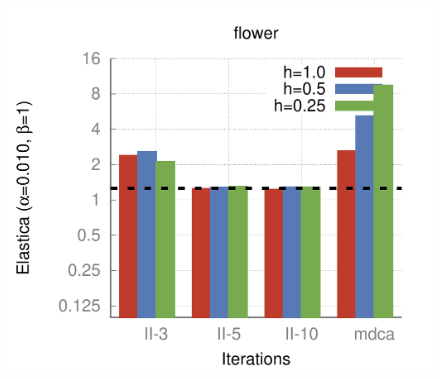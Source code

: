 \begin{figure}[]
{\includegraphics[scale=0.4]{figures/chapter5/flow/plots/bars/length_pen_0.01000/flower.pdf}
}\hspace{1em}%
\hspace{1em}%
\subfloat{
}
\end{figure}
